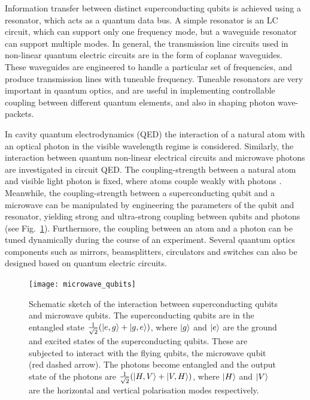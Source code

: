 Information transfer between distinct superconducting qubits is achieved using a resonator, which acts as a quantum data bus. A simple resonator is an LC circuit, which can support only one frequency mode, but a waveguide resonator can support multiple modes. In general, the transmission line circuits used in non-linear quantum electric circuits are in the form of coplanar waveguides. These waveguides are engineered to handle a particular set of frequencies, and produce transmission lines with tuneable frequency. Tuneable resonators are very important in quantum optics, and are useful in implementing controllable coupling between different quantum elements, and also in shaping photon wave-packets. 

In cavity quantum electrodynamics (QED) the interaction of a natural atom with an optical photon in the visible wavelength regime is considered. Similarly, the interaction between quantum non-linear electrical circuits and  microwave photons are investigated in circuit QED. The coupling-strength between a natural atom and visible light photon is fixed, where atoms couple weakly with photons \cite{bib:raimond2001manipulating}. Meanwhile, the coupling-strength between a superconducting qubit and a microwave can be manipulated by engineering the parameters of the qubit and resonator, yielding strong and ultra-strong coupling between qubits and photons \cite{bib:wallraff2004strong} (see Fig.~\ref{fig:microwave_qubits}). Furthermore, the coupling between an atom and a photon can be tuned dynamically during the course of an experiment. Several quantum optics components such as mirrors, beamsplitters, circulators and switches can also be designed based on quantum electric circuits.

\begin{figure}[!htbp]
\texttt{[image: microwave\_qubits]}
\caption{Schematic sketch of the interaction between superconducting qubits and microwave qubits. The superconducting qubits are in the entangled state \mbox{$\frac{1}{\sqrt{2}}(|e,g\rangle + |g,e\rangle)$}, where $|g\rangle$ and $|e\rangle$ are the ground and excited states of the superconducting qubits. These are subjected to interact with the flying qubits, the microwave qubit (red dashed arrow). The photons become entangled and the output state of the photons are \mbox{$\frac{1}{\sqrt{2}}(|H,V\rangle + |V,H\rangle)$}, where $|H\rangle$ and $|V\rangle$ are the horizontal and vertical polarisation modes respectively.}\label{fig:microwave_qubits}
\end{figure}

